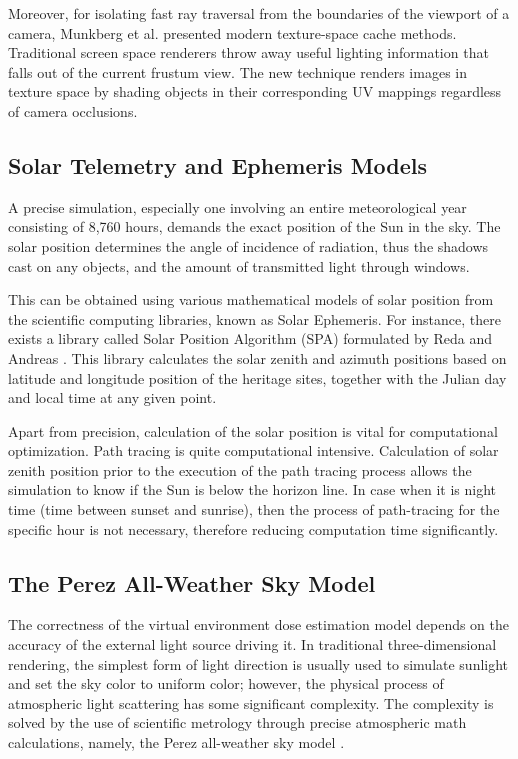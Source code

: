 Moreover, for isolating fast ray traversal from the boundaries of the viewport of a camera, Munkberg et al. \cite{hasselgren2016texture} presented modern texture-space cache methods. Traditional screen space renderers throw away useful lighting information that falls out of the current frustum view. The new technique renders images in texture space by shading objects in their corresponding UV mappings regardless of camera occlusions.

\subsection{Solar Telemetry and Ephemeris Models}
A precise simulation, especially one involving an entire meteorological year consisting of 8,760 hours, demands the exact position of the Sun in the sky. The solar position determines the angle of incidence of radiation, thus the shadows cast on any objects, and the amount of transmitted light through windows.

This can be obtained using various mathematical models of solar position from the scientific computing libraries, known as Solar Ephemeris. For instance, there exists a library called Solar Position Algorithm (SPA) formulated by Reda and Andreas \cite{reda2004solar}. This library calculates the solar zenith and azimuth positions based on latitude and longitude position of the heritage sites, together with the Julian day and local time at any given point.

Apart from precision, calculation of the solar position is vital for computational optimization. Path tracing is quite computational intensive. Calculation of solar zenith position prior to the execution of the path tracing process allows the simulation to know if the Sun is below the horizon line. In case when it is night time (time between sunset and sunrise), then the process of path-tracing for the specific hour is not necessary, therefore reducing computation time significantly.

\subsection{The Perez All-Weather Sky Model}
The correctness of the virtual environment dose estimation model depends on the accuracy of the external light source driving it. In traditional three-dimensional rendering, the simplest form of light direction is usually used to simulate sunlight and set the sky color to uniform color; however, the physical process of atmospheric light scattering has some significant complexity. The complexity is solved by the use of scientific metrology through precise atmospheric math calculations, namely, the Perez all-weather sky model \cite{perez1993all}.

